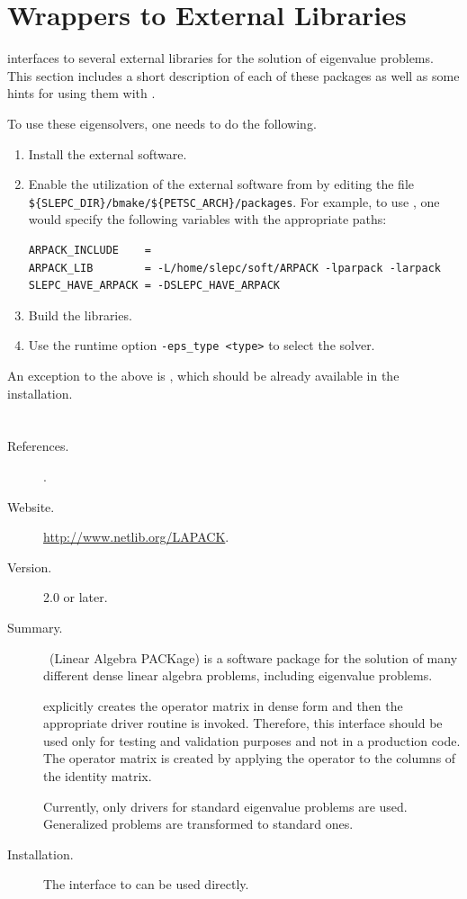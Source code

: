 \section{Wrappers to External Libraries}
\label{sec:wrap}

	\slepc interfaces to several external libraries for the solution of eigenvalue problems. This section includes a short description of each of these packages as well as some hints for using them with \slepc.

	To use these eigensolvers, one needs to do the following.
	\begin{enumerate}
	\item Install the external software.
	\item Enable the utilization of the external software from \slepc by editing the file \Verb!${SLEPC_DIR}/bmake/${PETSC_ARCH}/packages!. For example, to use \arpack, one would specify the following variables with the appropriate paths:
	\begin{Verbatim}[fontsize=\small]
ARPACK_INCLUDE    = 
ARPACK_LIB        = -L/home/slepc/soft/ARPACK -lparpack -larpack
SLEPC_HAVE_ARPACK = -DSLEPC_HAVE_ARPACK
	\end{Verbatim}
	\item Build the \slepc libraries.
	\item Use the runtime option \Verb!-eps_type <type>! to select the solver.
	\end{enumerate}

	An exception to the above is \lapack, which should be already available in the \petsc{} installation.

\section*{\underline{\lapack}}
	\begin{description}
	\item[References.]\citep{Anderson:1992:LUG}.
	\item[Website.] \url{http://www.netlib.org/LAPACK}.
	\item[Version.] 2.0 or later.
	\item[Summary.] \lapack\ (Linear Algebra PACKage) is a software package for the solution of many different dense linear algebra problems, including eigenvalue problems.

	\slepc explicitly creates the operator matrix in dense form and then the appropriate \lapack{} driver routine is invoked. Therefore, this interface should be used only for testing and validation purposes and not in a production code. The operator matrix is created by applying the operator to the columns of the identity matrix.

	Currently, only \lapack{} drivers for standard eigenvalue problems are
used. Generalized problems are transformed to standard ones.
	
	\item[Installation.]
	The \slepc interface to \lapack{} can be used directly.
	\end{description}

